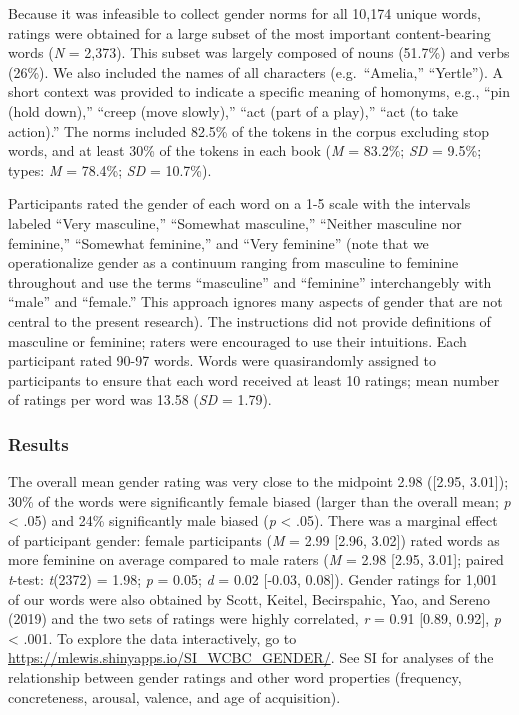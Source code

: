 \documentclass[
  english,
  ,man,floatsintext]{apa6}
\begin{document}
Because it was infeasible to collect gender norms for all 10,174 unique words, ratings were obtained for a large subset of the most important content-bearing words (\emph{N} = 2,373). This subset was largely composed of nouns (51.7\%) and verbs (26\%). We also included the names of all characters (e.g.~``Amelia,'' ``Yertle''). A short context was provided to indicate a specific meaning of homonyms, e.g., ``pin (hold down),'' ``creep (move slowly),'' ``act (part of a play),'' ``act (to take action).'' The norms included 82.5\% of the tokens in the corpus excluding stop words, and at least 30\% of the tokens in each book (\emph{M} = 83.2\%; \emph{SD} = 9.5\%; types: \emph{M} = 78.4\%; \emph{SD} = 10.7\%).

Participants rated the gender of each word on a 1-5 scale with the intervals labeled ``Very masculine,'' ``Somewhat masculine,'' ``Neither masculine nor feminine,'' ``Somewhat feminine,'' and ``Very feminine'' (note that we operationalize gender as a continuum ranging from masculine to feminine throughout and use the terms ``masculine'' and ``feminine'' interchangebly with ``male'' and ``female.'' This approach ignores many aspects of gender that are not central to the present research). The instructions did not provide definitions of masculine or feminine; raters were encouraged to use their intuitions. Each participant rated 90-97 words. Words were quasirandomly assigned to participants to ensure that each word received at least 10 ratings; mean number of ratings per word was 13.58 (\emph{SD} = 1.79).

\hypertarget{results}{%
\subsubsection{Results}\label{results}}

The overall mean gender rating was very close to the midpoint 2.98 ({[}2.95, 3.01{]}); 30\% of the words were significantly female biased (larger than the overall mean; \emph{p} \textless{} .05) and 24\% significantly male biased (\emph{p} \textless{} .05). There was a marginal effect of participant gender: female participants (\emph{M} = 2.99 {[}2.96, 3.02{]}) rated words as more feminine on average compared to male raters (\emph{M} = 2.98 {[}2.95, 3.01{]}; paired \emph{t}-test: \emph{t}(2372) = 1.98; \emph{p} = 0.05; \emph{d} = 0.02 {[}-0.03, 0.08{]}). Gender ratings for 1,001 of our words were also obtained by Scott, Keitel, Becirspahic, Yao, and Sereno (2019) and the two sets of ratings were highly correlated, \emph{r} = 0.91 {[}0.89, 0.92{]}, \emph{p} \textless{} .001. To explore the data interactively, go to \url{https://mlewis.shinyapps.io/SI_WCBC_GENDER/}. See SI for analyses of the relationship between gender ratings and other word properties (frequency, concreteness, arousal, valence, and age of acquisition).
\end{document}

